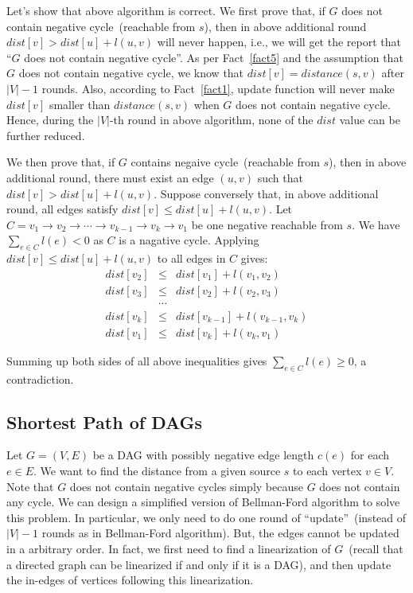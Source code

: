Let's show that above algorithm is correct.
We first prove that, if $G$ does not contain negative cycle~(reachable from $s$), then in above additional round $dist[v] > dist[u] + l(u,v)$ will never happen,
i.e., we will get the report that ``$G$ does not contain negative cycle''.
As per Fact~\ref{fact5} and the assumption that $G$ does not contain negative
cycle, we know that $dist[v] = distance(s,v)$ after $|V| -1 $ rounds.  Also,
	according to Fact~\ref{fact1}, update function will never make $dist[v]$
	smaller than $distance(s,v)$ when $G$ does not contain negative cycle.
	Hence, during the $|V|$-th round in above algorithm, none of the $dist$
	value can be further reduced.

We then prove that, if $G$ contains negaive cycle~(reachable from $s$), then in above additional round, there must exist an edge $(u,v)$ such that $dist[v] > dist[u] + l(u,v)$.
Suppose conversely that, in above additional round, all edges satisfy $dist[v] \le dist[u] + l(u,v)$.
Let $C = v_1 \to v_2 \to \cdots \to v_{k-1} \to v_k \to v_1$ be one negative reachable from $s$.  We have $\sum_{e\in C} l(e) < 0$ as $C$ is a nagative cycle.
Applying $dist[v] \le dist[u] + l(u,v)$ to all edges in $C$ gives:
\begin{displaymath}
\begin{array}{llllllllllllll}
	dist[v_2] & \le & dist[v_1] + l(v_1, v_2) \\
	dist[v_3] & \le & dist[v_2] + l(v_2, v_3) \\
	& \cdots & \\
	dist[v_k] & \le & dist[v_{k-1}] + l(v_{k-1}, v_k) \\
	dist[v_1] & \le & dist[v_{k}] + l(v_{k}, v_1)
\end{array}
\end{displaymath}

Summing up both sides of all above inequalities gives $\sum_{e\in C} l(e) \ge 0$, a contradiction.


\subsection*{Shortest Path of DAGs}

Let $G = (V, E)$ be a DAG with possibly negative edge length $c(e)$ for each $e\in E$.
We want to find the distance from a given source $s$ to each vertex $v\in V$.
Note that $G$ does not contain negative cycles simply because $G$ does not contain any cycle.
We can design a simplified version of Bellman-Ford algorithm to solve this problem.
In particular, we only need to do one round of ``update''~(instead of $|V|-1$ rounds as in Bellman-Ford algorithm).
But, the edges cannot be updated in a arbitrary order. In fact,
we first need to find a linearization of $G$~(recall that a directed graph can be linearized if and only if it is a DAG),
and then update the in-edges of vertices following this linearization.

